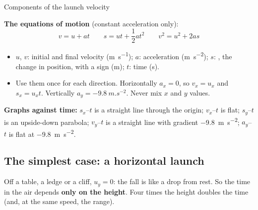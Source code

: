\begin{formulacard}[notonsheet]{Components of the launch velocity}
  \begin{symbols}
  \end{symbols}
\end{formulacard}

\textbf{The equations of motion} (constant acceleration only):
\[ v = u + at \qquad s = ut + \frac{1}{2}at^2 \qquad v^2 = u^2 + 2as \]
{\centering\hscbadgeonsheet\par}
\begin{itemize}
  \item $u$, $v$: initial and final velocity (\si{m.s^{-1}}); $a$: acceleration (\si{m.s^{-2}});
        $s$: , the change in position, with a sign (\si{m}); $t$: time (\si{s}).
  \item Use them once for each direction. Horizontally $a_x = 0$, so $v_x = u_x$ and
        $s_x = u_x t$. Vertically $a_y = \qty{-9.8}{m.s^{-2}}$. Never mix $x$ and $y$ values.
\end{itemize}

\textbf{Graphs against time:} $s_x$--$t$ is a straight line through the origin; $v_x$--$t$ is
flat; $s_y$--$t$ is an upside-down parabola; $v_y$--$t$ is a straight line with gradient
\qty{-9.8}{m.s^{-2}}; $a_y$--$t$ is flat at \qty{-9.8}{m.s^{-2}}.

\subsection{The simplest case: a horizontal launch}
Off a table, a ledge or a cliff, $u_y = 0$: the fall is like a drop from rest. So the time in
the air depends \textbf{only on the height}. Four times the height doubles the time (and, at
the same speed, the range).

